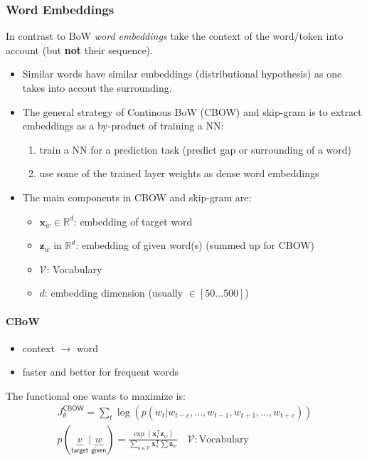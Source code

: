 \subsubsection{Word Embeddings}
In contrast to BoW \textit{word embeddings} take the context of the word/token into account (but \textbf{not} their sequence).
\begin{itemize}
    \item Similar words have similar embeddings (distributional hypothesis) as one takes into accout the surrounding.
    \item The general strategy of Continous BoW (CBOW) and skip-gram is to extract embeddings as a by-product of training a NN:
          \begin{enumerate}
              \item train a NN for a prediction task (predict gap or surrounding of a word)
              \item use some of the trained layer weights as dense word embeddings
          \end{enumerate}
    \item The main components in CBOW and skip-gram are:
          \begin{itemize}
              \item $\mathbf{x}_w \in \mathbb{R}^d$: embedding of target word
              \item $\mathbf{z} _w$ in $\mathbb{R}^d$: embedding of given word(s) (summed up for CBOW)
              \item $\mathcal{V}$: Vocabulary
              \item $d$: embedding dimension (usually $\in [50\dots500]$)
          \end{itemize}
\end{itemize}

\paragraph{CBoW}
\begin{itemize}
    \item context $\to$ word
    \item faster and better for frequent words
\end{itemize}

The functional one wants to maximize is:
\noindent\begin{gather*}
    J_\theta^{\mathsf{CBOW}}                                               = \sum_{t}\log\left(p(w_t|w_{t-c},\ldots, w_{t-1},w_{t+1},\ldots, w_{t+c})\right)                                   \\
    p(\underbrace{v}_{\textsf{target}} | \underbrace{w}_{\textsf{given}})  = \frac{\exp(\mathbf{x}_v^{\mathsf{T}}\mathbf{z}_w)}{\sum\limits_{u\in \mathcal{V}} \mathbf{x}_u^{\mathsf{T}}\sum\mathbf{z}_w} \quad \mathcal{V}: \text{Vocabulary}
\end{gather*}

